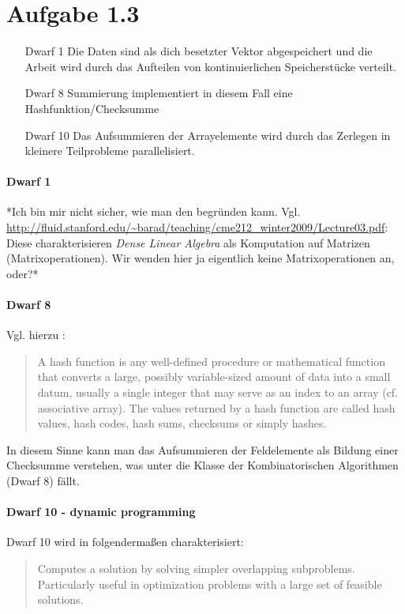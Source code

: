 \documentclass[a4paper,
               12pt,
               titlepage,
               BCOR12mm,
               ]{scrartcl}
\begin{document}
  
  \section*{Aufgabe 1.3}

    \begin{itemize}
      \item [Dwarf 1] Die Daten sind als dich besetzter Vektor abgespeichert und die Arbeit wird durch das Aufteilen von kontinuierlichen Speicherstücke verteilt.
      \item [Dwarf 8] Summierung implementiert in diesem Fall eine Hashfunktion/Checksumme
      \item [Dwarf 10] Das Aufsummieren der Arrayelemente wird durch das Zerlegen in kleinere Teilprobleme parallelisiert.
    \end{itemize}
		\paragraph{Dwarf 1}
		*Ich bin mir nicht sicher, wie man den begründen kann. Vgl.
		\url{http://fluid.stanford.edu/~barad/teaching/cme212_winter2009/Lecture03.pdf}: Diese
		charakterisieren \emph{Dense Linear Algebra} als Komputation auf Matrizen
		(Matrixoperationen). Wir wenden hier ja eigentlich keine Matrixoperationen an, oder?*
		
		\paragraph{Dwarf 8}
		Vgl. hierzu \cite{wiki_hash}:
		\begin{quotation}
			A hash function is any well-defined procedure or mathematical function that converts
			a large, possibly variable-sized amount of data into a small datum, usually a single
			integer that may serve as an index to an array (cf. associative array). The values
			returned by a hash function are called hash values, hash codes, hash sums, checksums
			or simply hashes.
		\end{quotation}
		In diesem Sinne kann man das Aufsummieren der Feldelemente als Bildung einer
		Checksumme verstehen, was unter die Klasse der Kombinatorischen Algorithmen (Dwarf 8)
		fällt.

		\paragraph{Dwarf 10 - dynamic programming}
		Dwarf 10 wird in \cite[S. 16]{eecs} folgendermaßen charakterisiert:
		\begin{quotation}
			Computes a solution by solving simpler overlapping subproblems.
			Particularly useful in optimization problems with a large set of feasible
			solutions.
		\end{quotation}
\end{document}
